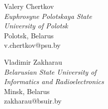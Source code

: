 \documentclass{article}
\begin{document}
\begin{multicols}{2}
\raggedright
\Large
 \hspace{4cm} Valery Chertkov\\
 \hspace{2.5cm} \textit{Euphrosyne Polotskaya State}\\
 \hspace{3cm}  \textit{University of Polotsk}\\
  \hspace{4cm} Polotsk, Belarus\\
   \hspace{3.5cm} v.chertkov@psu.by
\columnbreak

\raggedleft
\Large
 Vladimir Zakharau   \ \ \ \ \ \ \ \ \ \ \\ 
\textit{Belarusian State University of}\\
 \hspace{-3cm}\textit{Informatics and Radioelectronics}\\
 \hspace{-4cm}Minsk, Belarus \ \ \ \ \ \ \ \ \ \ \\ 
 \hspace{-3.5cm}zakharau@bsuir.by \ \ \ \ \ \ \ \ \ \
\end{multicols}
\ \\ 
\end{document}
